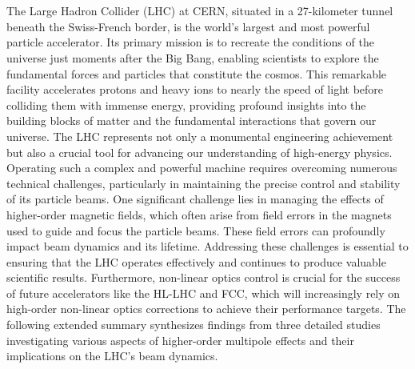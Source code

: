 \chapter{}



\vspace{\vspacesummary}

{
\fontsize{\fontsizesummary}{\fontskipsummary}\selectfont

The Large Hadron Collider (LHC) at CERN, situated in a 27-kilometer tunnel beneath the Swiss-French
border, is the world's largest and most powerful particle accelerator. Its primary mission is to
recreate the conditions of the universe just moments after the Big Bang, enabling scientists to
explore the fundamental forces and particles that constitute the cosmos. This remarkable facility
accelerates protons and heavy ions to nearly the speed of light before colliding them with immense
energy, providing profound insights into the building blocks of matter and the fundamental
interactions that govern our universe. The LHC represents not only a monumental engineering
achievement but also a crucial tool for advancing our understanding of high-energy physics.
\\
\indent
Operating such a complex and powerful machine requires overcoming numerous technical challenges,
particularly in maintaining the precise control and stability of its particle beams. One significant
challenge lies in managing the effects of higher-order magnetic fields, which often arise from field
errors in the magnets used to guide and focus the particle beams. These field errors can profoundly
impact beam dynamics and its lifetime. Addressing these challenges is essential to ensuring that
the LHC operates effectively and continues to produce valuable scientific results. Furthermore,
non-linear optics control is crucial for the success of future accelerators like the HL-LHC and FCC,
which will increasingly rely on high-order non-linear optics corrections to achieve their
performance targets. The following extended summary synthesizes findings from three detailed studies
investigating various aspects of higher-order multipole effects and their implications on the LHC's
beam dynamics.


}

